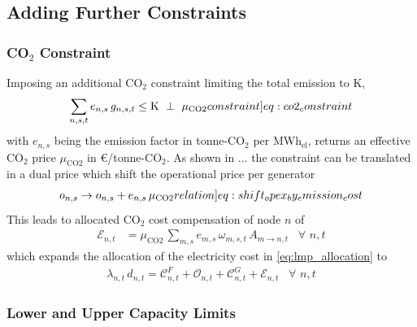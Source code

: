 \documentclass[11pt,twocolumn]{article}
\newcommand{\generation}[1][n]{g_{#1,s,t}}
\newcommand{\generationshare}[1][n]{\omega_{#1,s,t}}
\newcommand{\capacityGeneration}{G_{n,s}}
\newcommand{\capexGeneration}{c_{n,s}}
\newcommand{\opexGeneration}[1][n]{o_{#1,s}}
\newcommand{\nodaldemand}[1][n]{d_{#1,t}}
\newcommand{\lmp}[1][n]{\lambda_{#1,t}}
\newcommand{\allocatePeer}[1][m \rightarrow n]{A_{#1,t}}
\newcommand{\allocateCapexGeneration}[1][n]{\mathcal{C}^{G}_{#1,t}}
\newcommand{\allocateCapexFlow}[1][n]{\mathcal{C}^{F}_{#1,t}}
\newcommand{\allocateOpex}[1][n]{\mathcal{O}_{#1,t}}
\newcommand{\allocateEmissionCost}[1][n]{\mathcal{E}_{#1,t}}
\newcommand{\emission}[1][n]{e_{#1,s}}
\newcommand{\emissionPrice}{\mu_{\text{CO2}}}
\newcommand{\megawatthour}{MWh$_\text{el}$}
\newcommand{\resultsin}[1]{\hspace{6pt} \bot  \hspace{6pt} #1}
\newcommand{\Forall}[1]{\hspace{10pt} \forall \,\, #1 }
\begin{document}
\subsection{Adding Further Constraints}
\subsubsection*{CO$_2$ Constraint}

Imposing an additional CO$_2$ constraint limiting the total emission to K,  
\begin{align}
\sum_{n,s,t} \emission \, \generation \le \text{K} \resultsin{\emissionPrice} 
\label[constraint]{eq:co2_constraint}
\end{align}
with $\emission$ being the emission factor in tonne-CO$_2$ per \megawatthour, returns an effective CO$_2$ price $\emissionPrice$ in \euro/tonne-CO$_2$. 
% 
As shown in ... the constraint can be translated in a dual price which shift the operational price per generator
\begin{align}
\opexGeneration \rightarrow \opexGeneration + \emission \, \emissionPrice \label[relation]{eq:shift_opex_by_emission_cost}
\end{align}
This leads to allocated CO$_2$ cost compensation of node $n$ of
\begin{align}
\allocateEmissionCost &= \emissionPrice \, \sum_{m,s} \emission[m] \, \generationshare[m] \, \allocatePeer \Forall{n,t} \label{eq:allocate_emissionPrice}
\end{align}
which expands the allocation of the electricity cost in \cref{eq:lmp_allocation} to 
\begin{align}
\lmp \, \nodaldemand = \allocateCapexFlow + \allocateOpex + \allocateCapexGeneration  + \allocateEmissionCost \Forall{n,t}
\label{eq:lmp_allocation_with_emission}
\end{align}

\subsubsection*{Lower and Upper Capacity Limits}
\end{document}
